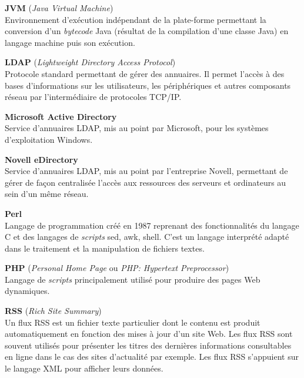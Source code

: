 \vspace{0.5cm}

\textbf{JVM} (\textit{Java Virtual Machine})\\
Environnement d'ex\'ecution ind\'ependant de la plate-forme permettant la conversion d'un \textit{bytecode} Java (r\'esultat de la compilation d'une classe Java) en langage machine puis son ex\'ecution.

\vspace{0.5cm}

\textbf{LDAP} (\textit{Lightweight Directory Access Protocol})\\
Protocole standard permettant de g\'erer des annuaires. 
Il permet l'acc\`es \`a des bases d'informations sur les utilisateurs, les p\'eriph\'eriques et autres composants r\'eseau par l'interm\'ediaire de protocoles TCP/IP.

\vspace{0.5cm}

\textbf{Microsoft Active Directory}\\
Service d'annuaires LDAP, mis au point par Microsoft, pour les syst\`emes d'exploitation Windows.

\vspace{0.5cm}

\textbf{Novell eDirectory}\\
Service d'annuaires LDAP, mis au point par l'entreprise Novell, permettant de g\'erer de fa\c{c}on centralis\'ee l'acc\`es aux ressources des serveurs et ordinateurs au sein d'un m\^eme r\'eseau.

\vspace{0.5cm}

\textbf{Perl}\\
Langage de programmation cr\'e\'e en 1987 reprenant des fonctionnalit\'es du langage C et des langages de \textit{scripts} sed, awk, shell.
C'est un langage interpr\'et\'e adapt\'e dans le traitement et la manipulation de fichiers textes.

\vspace{0.5cm}

\textbf{PHP} (\textit{Personal Home Page} ou \textit{PHP: Hypertext Preprocessor})\\
Langage de \textit{scripts} principalement utilis\'e pour produire des pages Web dynamiques.

\vspace{0.5cm}

\textbf{RSS} (\textit{Rich Site Summary})\\
Un flux RSS est un fichier texte particulier dont le contenu est produit automatiquement en fonction des mises \`a jour d'un site Web.
Les flux RSS sont souvent utilis\'es pour pr\'esenter les titres des derni\`eres informations consultables en ligne dans le cas des sites d'actualit\'e par exemple.
Les flux RSS s'appuient sur le langage XML pour afficher leurs donn\'ees.

